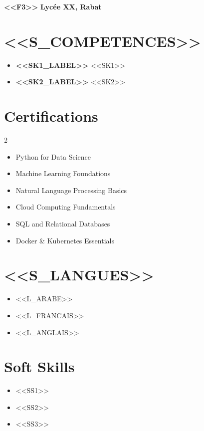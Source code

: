 \documentclass[11pt,a4paper]{extarticle}
\let\oldtextbf\textbf
\renewcommand{\textbf}[1]{\textcolor{primary}{\oldtextbf{#1}}}
\begin{document}
\textbf{<<F3>>} \hfill \textbf{Lycée XX, Rabat}

\section*{<<S_COMPETENCES>>}
\begin{itemize}
    \item \textbf{<<SK1_LABEL>>} <<SK1>>
    \item \textbf{<<SK2_LABEL>>} <<SK2>>
\end{itemize}

\section*{Certifications}
\setlength{\multicolsep}{0pt}
\begin{multicols}{2}
\begin{itemize}
    \item Python for Data Science
    \item Machine Learning Foundations
    \item Natural Language Processing Basics
    \item Cloud Computing Fundamentals
    \item SQL and Relational Databases
    \item Docker \& Kubernetes Essentials
\end{itemize}
\end{multicols}

\vspace{1pt}

\begin{minipage}[t]{0.48\textwidth}
    \section*{<<S_LANGUES>>}
    \begin{itemize}
        \item <<L_ARABE>>
        \item <<L_FRANCAIS>>
        \item <<L_ANGLAIS>>
    \end{itemize}
\end{minipage}
\hfill
\begin{minipage}[t]{0.48\textwidth}
    \section*{Soft Skills}
    \begin{itemize}
        \item <<SS1>>
        \item <<SS2>>
        \item <<SS3>>
    \end{itemize}
\end{minipage}
\end{document}
